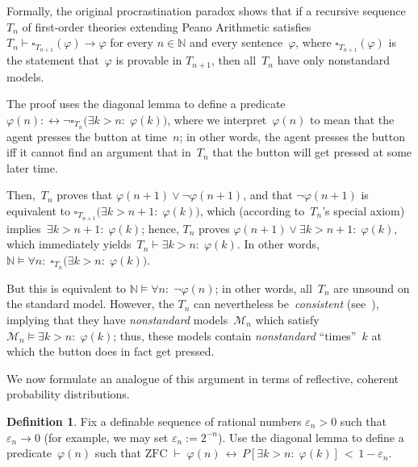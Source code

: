\documentclass[12pt]{article}
\newcommand{\vp}{\varphi}
\newcommand{\NN}{\mathbb{N}}
\newcommand{\zfc}{\mathrm{ZFC}}
\newcommand{\cM}{\mathcal{M}}
\theoremstyle{plain}
\theoremstyle{definition}
\newtheorem{definition}[theorem]{Definition}
\theoremstyle{remark}
\begin{document}
Formally, the original procrastination paradox shows that if a recursive sequence~$T_n$ of first-order theories extending Peano Arithmetic satisfies $T_n \vdash \square_{T_{n+1}}(\vp)\to\vp$ for every $n\in\NN$ and every sentence~$\vp$, where $\square_{T_{n+1}}(\vp)$ is the statement that~$\vp$ is provable in $T_{n+1}$, then all~$T_n$ have only nonstandard models.

The proof uses the diagonal lemma to define a predicate~$\vp(n) :\leftrightarrow \neg\square_{T_n}\big(\exists k>n{:}\;\vp(k)\big)$, where we interpret~$\vp(n)$ to mean that the agent presses the button at time~$n$; in other words, the agent presses the button iff it cannot find an argument that in~$T_n$ that the button will get pressed at some later time.

Then,~$T_n$ proves that $\vp(n+1)\vee\neg\vp(n+1)$, and that $\neg\vp(n+1)$ is equivalent to $\square_{T_{n+1}}\big(\exists k>n+1{:}\;\vp(k)\big)$, which (according to~$T_n$'s special axiom) implies~$\exists k>n+1{:}\;\vp(k)$; hence, $T_n$ proves $\vp(n+1)\vee\exists k>n+1{:}\;\vp(k)$, which immediately yields~$T_n\vdash\exists k>n{:}\;\vp(k)$. In other words, $\NN\vDash\forall n{:}\;\square_{T_n}\big(\exists k>n{:}\;\vp(k)\big)$. 

But this is equivalent to $\NN\vDash\forall n{:}\;\neg\vp(n)$; in other words, all~$T_n$ are unsound on the standard model. However, the $T_n$ can nevertheless be~\emph{consistent} (see~\cite{yudkowsky13}), implying that they have \emph{nonstandard} models~$\cM_n$ which satisfy $\cM_n\vDash\exists k>n{:}\;\vp(k)$; thus, these models contain \emph{nonstandard} ``times''~$k$ at which the button does in fact get pressed.

We now formulate an analogue of this argument in terms of reflective, coherent probability  distributions.

\begin{definition}
Fix a definable sequence of rational numbers $\varepsilon_n > 0$ such that $\varepsilon_n\to0$ (for example, we may set $\varepsilon_n := 2^{-n}$). Use the diagonal lemma to define a predicate~$\vp(n)$ such that $\zfc\;\vdash\;\vp(n)\,\leftrightarrow\, P[\exists k>n{:}\;\vp(k)] \,<\, 1 - \varepsilon_n$.
\end{definition}
\end{document}

